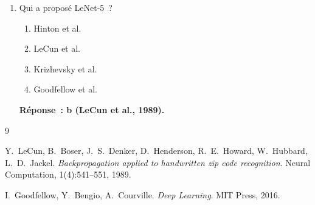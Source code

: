 \documentclass[a4paper,11pt]{article}
\theoremstyle{definition}
\theoremstyle{remark}
\begin{document}
\begin{enumerate}
  \item Qui a propos\'e LeNet-5~?
    \begin{enumerate}
      \item Hinton et al.
      \item LeCun et al.
      \item Krizhevsky et al.
      \item Goodfellow et al.
    \end{enumerate}
    \textbf{R\'eponse~: b (LeCun et al., 1989).}

\end{enumerate}

\begin{thebibliography}{9}

  Y.~LeCun, B.~Boser, J.~S.~Denker, D.~Henderson, R.~E.~Howard,
  W.~Hubbard, L.~D.~Jackel.
  \newblock \emph{Backpropagation applied to handwritten zip code
    recognition}.
  \newblock Neural Computation, 1(4):541--551, 1989.

  I.~Goodfellow, Y.~Bengio, A.~Courville.
  \newblock \emph{Deep Learning}.
  \newblock MIT Press, 2016.

\end{thebibliography}
\end{document}
